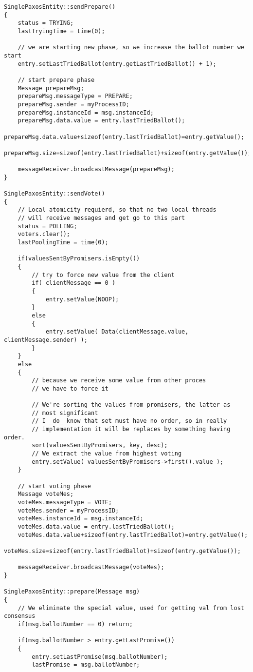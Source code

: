 \begin{lstlisting}[frame=lines,caption=Pseudocode of Paxos algorithm]
SinglePaxosEntity::sendPrepare()
{
	status = TRYING;
	lastTryingTime = time(0);
	
	// we are starting new phase, so we increase the ballot number we start
	entry.setLastTriedBallot(entry.getLastTriedBallot() + 1);
	
	// start prepare phase
	Message prepareMsg;
	prepareMsg.messageType = PREPARE;
	prepareMsg.sender = myProcessID;
	prepareMsg.instanceId = msg.instanceId;
	prepareMsg.data.value = entry.lastTriedBallot();
	prepareMsg.data.value+sizeof(entry.lastTriedBallot)=entry.getValue();
	prepareMsg.size=sizeof(entry.lastTriedBallot)+sizeof(entry.getValue());
	
	messageReceiver.broadcastMessage(prepareMsg);
}

SinglePaxosEntity::sendVote()
{
	// Local atomicity requierd, so that no two local threads
	// will receive messages and get go to this part
	status = POLLING;   
	voters.clear();
	lastPoolingTime = time(0);
	
	if(valuesSentByPromisers.isEmpty())
	{
		// try to force new value from the client
		if( clientMessage == 0 )
		{
			entry.setValue(NOOP);
		}
		else
		{
			entry.setValue( Data(clientMessage.value, clientMessage.sender) );
		}
	}
	else
	{
		// because we receive some value from other proces
		// we have to force it
		
		// We're sorting the values from promisers, the latter as
		// most significant
		// I _do_ know that set must have no order, so in really
		// implementation it will be replaces by something having order.
		sort(valuesSentByPromisers, key, desc);
		// We extract the value from highest voting
		entry.setValue( valuesSentByPromisers->first().value );
	}
	
	// start voting phase
	Message voteMes;
	voteMes.messageType = VOTE;
	voteMes.sender = myProcessID;
	voteMes.instanceId = msg.instanceId;
	voteMes.data.value = entry.lastTriedBallot();
	voteMes.data.value+sizeof(entry.lastTriedBallot)=entry.getValue();
	voteMes.size=sizeof(entry.lastTriedBallot)+sizeof(entry.getValue());
	
	messageReceiver.broadcastMessage(voteMes);
}

SinglePaxosEntity::prepare(Message msg)
{
	// We eliminate the special value, used for getting val from lost consensus
	if(msg.ballotNumber == 0) return;
	
	if(msg.ballotNumber > entry.getLastPromise())
	{
		entry.setLastPromise(msg.ballotNumber);
		lastPromise = msg.ballotNumber;
		

\end{lstlisting}
